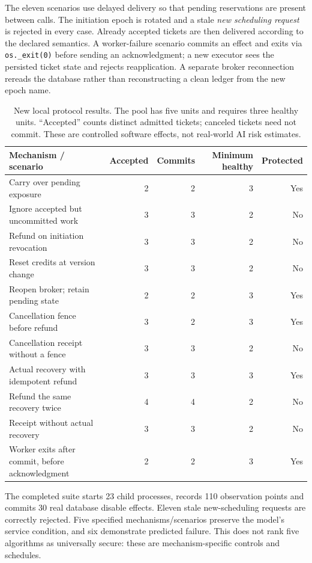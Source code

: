 The eleven scenarios use delayed delivery so that pending reservations are present between calls. The initiation epoch is rotated and a stale \emph{new scheduling request} is rejected in every case. Already accepted tickets are then delivered according to the declared semantics. A worker-failure scenario commits an effect and exits via \texttt{os.\_exit(0)} before sending an acknowledgment; a new executor sees the persisted ticket state and rejects reapplication. A separate broker reconnection rereads the database rather than reconstructing a clean ledger from the new epoch name.

\begin{table}[t]
\centering\small
\caption{New local protocol results. The pool has five units and requires three healthy units. ``Accepted'' counts distinct admitted tickets; canceled tickets need not commit. These are controlled software effects, not real-world AI risk estimates.}
\label{tab:async}
\begin{tabularx}{\linewidth}{@{}Xrrrr@{}}\toprule
Mechanism / scenario & Accepted & Commits & Minimum healthy & Protected\\\midrule
Carry over pending exposure &2&2&3&Yes\\
Ignore accepted but uncommitted work &3&3&2&No\\
Refund on initiation revocation &3&3&2&No\\
Reset credits at version change &3&3&2&No\\
Reopen broker; retain pending state &2&2&3&Yes\\
Cancellation fence before refund &3&2&3&Yes\\
Cancellation receipt without a fence &3&3&2&No\\
Actual recovery with idempotent refund &3&3&3&Yes\\
Refund the same recovery twice &4&4&2&No\\
Receipt without actual recovery &3&3&2&No\\
Worker exits after commit, before acknowledgment &2&2&3&Yes\\\bottomrule
\end{tabularx}
\end{table}
The completed suite starts 23 child processes, records 110 observation points and commits 30 real database disable effects. Eleven stale new-scheduling requests are correctly rejected. Five specified mechanisms/scenarios preserve the model's service condition, and six demonstrate predicted failure. This does not rank five algorithms as universally secure: these are mechanism-specific controls and schedules.

